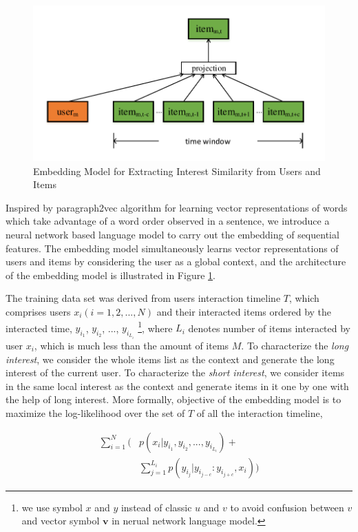 \documentclass{sig-alternate-05-2015}
\begin{document}
\begin{figure}[htbp]
	\centering
	\includegraphics[scale=0.55]{images/doc2vec.pdf}
	\caption{Embedding Model for Extracting Interest Similarity from Users and Items}
	\label{fig:doc2vec}
\end{figure}

Inspired by paragraph2vec algorithm \cite{le2014distributed} for learning
vector representations of words which take advantage of a word order observed in a sentence,
we introduce a neural network based language model to carry out the embedding of sequential features.
The embedding model simultaneously learns vector representations of users and items
by considering the user as a global context,
and the architecture of the embedding model is illustrated in Figure \ref{fig:doc2vec}.

The training data set was derived from users interaction timeline $T$,
which comprises users $x_i (i=1,2,...,N)$ and their interacted items ordered by the interacted time,
$y_{i_1}$, $y_{i_2}$, ..., $y_{i_{L_i}}$
\footnote{we use symbol $x$ and $y$ instead of classic $u$ and $v$ to avoid confusion between $v$
and vector symbol $\mathbf{v}$ in nerual network language model.},
where $L_i$ denotes number of items interacted by user $x_i$,
which is much less than the amount of items $M$.
To characterize the \emph{long interest}, we consider the whole items list as the context and generate
the long interest of the current user.
To characterize the \emph{short interest}, we consider items in the same local interest as the context
and generate items in it one by one with the help of long interest.
More formally, objective of the embedding model is to
maximize the log-likelihood over the set of $T$ of all the interaction timeline,

\begin{equation}
\begin{aligned}
	\sum_{i=1}^{N} \bigg( &p(x_i | y_{i_1}, y_{i_2}, ..., y_{i_{L_i}}) + \\
	                      &\sum_{j=1}^{L_i} p(y_{i_j} | y_{i_{j-c}} : y_{i_{j+c}}, x_i) \bigg)
\end{aligned}
\end{equation}
\end{document}
